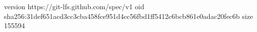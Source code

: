 version https://git-lfs.github.com/spec/v1
oid sha256:31def651acd3cc3cba458fce951d4cc56fbd1ff5412c6bcb861e0adac20fec6b
size 155594
